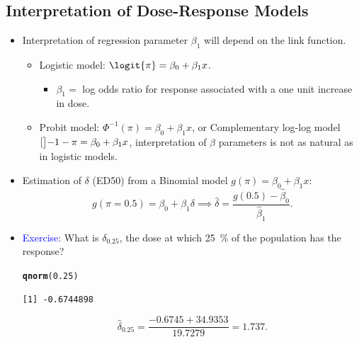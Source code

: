 \documentclass{article}\usepackage[]{graphicx}\usepackage[svgnames]{xcolor}
\makeatletter
\newcommand{\hlnum}[1]{\textcolor[rgb]{0.686,0.059,0.569}{#1}}%
\newcommand{\hlstd}[1]{\textcolor[rgb]{0.345,0.345,0.345}{#1}}%
\newcommand{\hlkwd}[1]{\textcolor[rgb]{0.737,0.353,0.396}{\textbf{#1}}}%
\newenvironment{kframe}{%
 \def\at@end@of@kframe{}%
 \ifinner\ifhmode%
  \def\at@end@of@kframe{\end{minipage}}%
  \begin{minipage}{\columnwidth}%
 \fi\fi%
 \def\FrameCommand##1{\hskip\@totalleftmargin \hskip-\fboxsep
 \colorbox{shadecolor}{##1}\hskip-\fboxsep
     \hskip-\linewidth \hskip-\@totalleftmargin \hskip\columnwidth}%
 \MakeFramed {\advance\hsize-\width
   \@totalleftmargin\z@ \linewidth\hsize
   \@setminipage}}%
 {\par\unskip\endMakeFramed%
 \at@end@of@kframe}
\newenvironment{knitrout}{}{} %
\let\log\relax%
\makeatother
\begin{document}
\subsection*{Interpretation of Dose-Response Models}
\begin{itemize}
      \item Interpretation of regression parameter $ \beta_1 $ will depend on the link function.
            \begin{itemize}
                  \item Logistic model: $ \logit{\pi}=\beta_0+\beta_1x $.
                        \begin{itemize}
                              \item $ \beta_1= $ log odds ratio for response associated with a one unit increase in dose.
                        \end{itemize}
                  \item Probit model: $ \Phi^{-1}(\pi)=\beta_0+\beta_1x $, or Complementary log-log model $ \log[\big]{-\log{1-\pi}}=\beta_0+\beta_1x $,
                        interpretation of $ \beta $ parameters is not as natural as in logistic models.
            \end{itemize}
      \item Estimation of $ \delta $ (ED50) from a Binomial model $ g(\pi)=\beta_0+\beta_1x $:
            \[ g(\pi=0.5)=\beta_0+\beta_1\delta\implies \hat{\delta}=\frac{g(0.5)-\hat{\beta}_0}{\hat{\beta}_1}.  \]
      \item \textcolor{Blue}{Exercise}: What is $ \delta_{0.25} $, the dose at which \qty{25}{\percent} of the population has the response?
\begin{knitrout}
\color{fgcolor}\begin{kframe}
\begin{alltt}
\hlkwd{qnorm}\hlstd{(}\hlnum{0.25}\hlstd{)}
\end{alltt}
\begin{verbatim}
[1] -0.6744898
\end{verbatim}
\end{kframe}
\end{knitrout}
            \[ \hat{\delta}_{0.25}=\frac{-0.6745+34.9353}{19.7279}=1.737. \]
\end{itemize}
\end{document}
